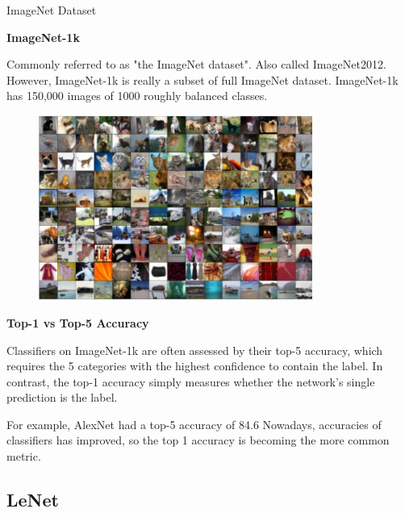 \begin{frame}[allowframebreaks]
\begin{mydefinitionblock}{7.1}{ImageNet Dataset}
    \par\noindent\textcolor{gray}{\hdashrule{\textwidth}{0.4pt}{1pt 2pt}}

    \textbf{ImageNet-1k}

    Commonly referred to as "the ImageNet dataset". Also called ImageNet2012.
    However, ImageNet-1k is really a subset of full ImageNet dataset.
    ImageNet-1k has 150,000 images of 1000 roughly balanced classes.

    \begin{figure}[H]
        \centering
        \includegraphics[width=0.8\textwidth]{.././assets/7.2.png}
    \end{figure}

    \par\noindent\textcolor{gray}{\hdashrule{\textwidth}{0.4pt}{1pt 2pt}}

    \textbf{Top-1 vs Top-5 Accuracy}

    Classifiers on ImageNet-1k are often assessed by their top-5 accuracy, which requires the 5 categories with the highest confidence to contain the label.
    In contrast, the top-1 accuracy simply measures whether the network's single prediction is the label.

    For example, AlexNet had a top-5 accuracy of 84.6%
    Nowadays, accuracies of classifiers has improved, so the top 1 accuracy is becoming the more common metric.
\end{mydefinitionblock}

\end{frame}

\subsection{LeNet}

